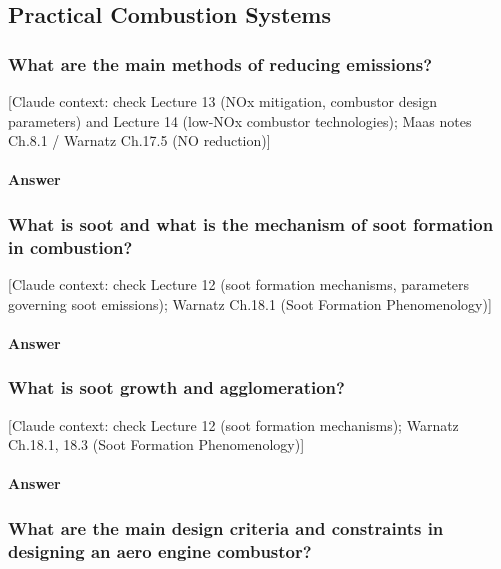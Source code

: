 \subsection{Practical Combustion Systems}

\subsubsection{What are the main methods of reducing  emissions?}

{\color{gray}\footnotesize [Claude context: check Lecture 13 (NOx mitigation, combustor design parameters) and Lecture 14 (low-NOx combustor technologies); Maas notes Ch.8.1 / Warnatz Ch.17.5 (NO reduction)]}

\paragraph{Answer}




\subsubsection{What is soot and what is the mechanism of soot formation in combustion?}

{\color{gray}\footnotesize [Claude context: check Lecture 12 (soot formation mechanisms, parameters governing soot emissions); Warnatz Ch.18.1 (Soot Formation Phenomenology)]}

\paragraph{Answer}




\subsubsection{What is soot growth and agglomeration?}

{\color{gray}\footnotesize [Claude context: check Lecture 12 (soot formation mechanisms); Warnatz Ch.18.1, 18.3 (Soot Formation Phenomenology)]}

\paragraph{Answer}




\subsubsection{What are the main design criteria and constraints in designing an aero engine combustor?}

